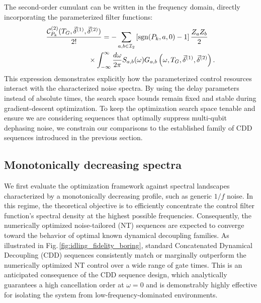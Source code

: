 \documentclass[%
 reprint,
superscriptaddress,
 amsmath,amssymb,
 aps,
pra,
]{revtex4-2}
\newcommand{\qk}[1]{{\color{OliveGreen}#1}}
\begin{document}
The second-order cumulant can be written in the frequency domain, directly incorporating the parameterized filter functions:
\begin{align}
    &\frac{\mathcal{C}^{(2)}_{P_k}(T_G, \vec{\delta}^{(1)}, \vec{\delta}^{(2)})}{2!} = -\sum_{a,b\in \mathcal{I}_2} \left[\text{sgn}(P_k,a,0)-1\right]\frac{Z_a Z_b}{2} \notag\\
    &\qquad\qquad\qquad \times \int_{-\infty}^\infty \frac{d\omega}{2\pi} S_{a,b}(\omega) G_{a,b}\left(\omega, T_G, \vec{\delta}^{(1)}, \vec{\delta}^{(2)}\right).
\end{align}
This expression demonstrates explicitly how the parameterized control resources interact with the characterized noise spectra.
By using the delay parameters instead of absolute times, the search space bounds remain fixed and stable during gradient-descent optimization.
To keep the optimization search space tenable and ensure we are considering sequences that optimally suppress multi-qubit dephasing noise, we constrain our comparisons to the established family of CDD sequences introduced in the previous section.


\subsection{Monotonically decreasing spectra}

We first evaluate the optimization framework against spectral landscapes characterized by a monotonically decreasing profile, such as generic $1/f$ noise. In this regime, the theoretical objective is to efficiently concentrate the control filter function's spectral density at the highest possible frequencies. Consequently, the numerically optimized noise-tailored (NT) sequences are expected to converge toward the behavior of optimal known dynamical decoupling families. As illustrated in Fig.\,\ref{fig:idling_fidelity_boring}, standard Concatenated Dynamical Decoupling (CDD) sequences consistently match or marginally outperform the numerically optimized NT control over a wide range of gate times. This is an anticipated consequence of the CDD sequence design, which analytically guarantees a high cancellation order at $\omega = 0$ and is demonstrably highly effective for isolating the system from low-frequency-dominated environments.
\end{document}
